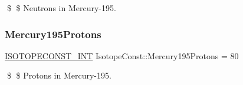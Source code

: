 \$ \$ Neutrons in Mercury-\/195. \mbox{\label{group___isotope_const-_mercury-_hg195_ga82b4eec611474d93c7822bc591e0ddad}} 
\subsubsection{\texorpdfstring{Mercury195\+Protons}{Mercury195Protons}}
{\footnotesize\ttfamily \mbox{\hyperlink{group___isotope_const-_macros_ga5f18360b3e99483a35c32d789e62621c}{I\+S\+O\+T\+O\+P\+E\+C\+O\+N\+S\+T\+\_\+\+I\+NT}} Isotope\+Const\+::\+Mercury195\+Protons = 80}

\$ \$ Protons in Mercury-\/195. 